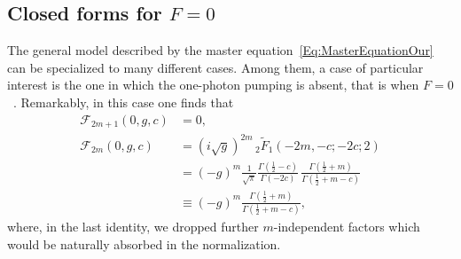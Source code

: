 \subsection{Closed forms for $F=0$}\label{subsec:closedForms}
The general model described by the master equation~\eqref{Eq:MasterEquationOur} can be specialized to many different cases.
Among them, a case of particular interest is the one in which the one-photon pumping is absent, that is when $F=0$~\cite{KryuchkyanOC96,MeaneyEPJQT14,LeghtasScience15,MingantiSciRep16}.
Remarkably, in this case one finds that
\begin{subequations}\label{Eq:FSimplified}
	\begin{align}
	{\mathcal{F}}_{2m+1}\left(0,g,c\right)&=0,
	\\
	{\mathcal{F}}_{2m}\left(0,g,c\right)&=\left(i\sqrt{g}\right)^{2m}
	\,_2\widetilde{F}_1\left(-2m,-c;-2c;2\right)
	\nonumber\\
	&=(-g)^m
	\frac{1}{\sqrt{\pi}}
	\frac{\Gamma\left(\frac{1}{2}-c\right)}
	{\Gamma\left(-2c\right)}\,
	\frac{\Gamma\left(\frac{1}{2}+m\right)}
	{\Gamma\left(\frac{1}{2}+m-c\right)}
	\nonumber\\
	&\equiv
	(-g)^m
	\frac{\Gamma\left(\frac{1}{2}+m\right)}
	{\Gamma\left(\frac{1}{2}+m-c\right)},
	\end{align}
\end{subequations}
where, in the last identity, we dropped further $m$-independent factors which would be naturally absorbed in the normalization.

